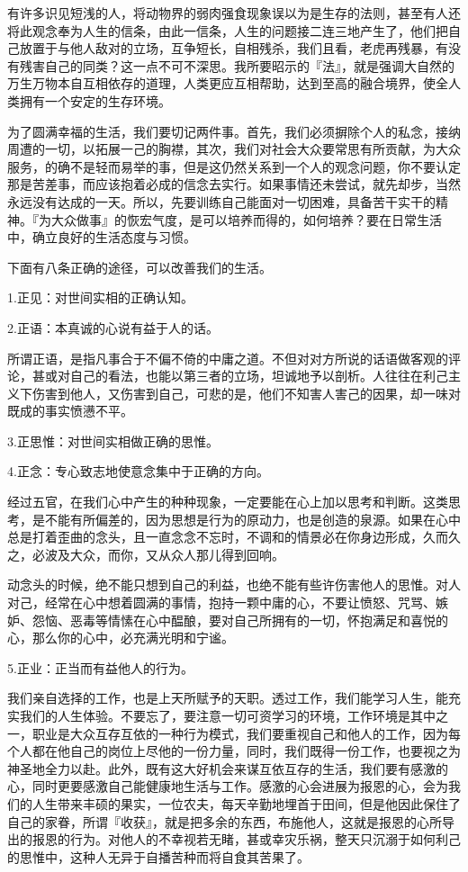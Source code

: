 \documentclass[12pt,twoside,openany]{book}
\begin{document}
有许多识见短浅的人，将动物界的弱肉强食现象误以为是生存的法则，甚至有人还将此观念奉为人生的信条，由此一信条，人生的问题接二连三地产生了，他们把自己放置于与他人敌对的立场，互争短长，自相残杀，我们且看，老虎再残暴，有没有残害自己的同类？这一点不可不深思。我所要昭示的『法』，就是强调大自然的万生万物本自互相依存的道理，人类更应互相帮助，达到至高的融合境界，使全人类拥有一个安定的生存环境。

为了圆满幸福的生活，我们要切记两件事。首先，我们必须摒除个人的私念，接纳周遭的一切，以拓展一己的胸襟，其次，我们对社会大众要常思有所贡献，为大众服务，的确不是轻而易举的事，但是这仍然关系到一个人的观念问题，你不要认定那是苦差事，而应该抱着必成的信念去实行。如果事情还未尝试，就先却步，当然永远没有达成的一天。所以，先要训练自己能面对一切困难，具备苦干实干的精神。『为大众做事』的恢宏气度，是可以培养而得的，如何培养？要在日常生活中，确立良好的生活态度与习惯。

下面有八条正确的途径，可以改善我们的生活。

1.正见：对世间实相的正确认知。

2.正语：本真诚的心说有益于人的话。

所谓正语，是指凡事合于不偏不倚的中庸之道。不但对对方所说的话语做客观的评论，甚或对自己的看法，也能以第三者的立场，坦诚地予以剖析。人往往在利己主义下伤害到他人，又伤害到自己，可悲的是，他们不知害人害己的因果，却一味对既成的事实愤懑不平。

3.正思惟：对世间实相做正确的思惟。

4.正念：专心致志地使意念集中于正确的方向。

经过五官，在我们心中产生的种种现象，一定要能在心上加以思考和判断。这类思考，是不能有所偏差的，因为思想是行为的原动力，也是创造的泉源。如果在心中总是打着歪曲的念头，且一直念念不忘时，不调和的情景必在你身边形成，久而久之，必波及大众，而你，又从众人那儿得到回响。

动念头的时候，绝不能只想到自己的利益，也绝不能有些许伤害他人的思惟。对人对己，经常在心中想着圆满的事情，抱持一颗中庸的心，不要让愤怒、咒骂、嫉妒、怨恼、恶毒等情愫在心中醖酿，要对自己所拥有的一切，怀抱满足和喜悦的心，那么你的心中，必充满光明和宁谧。

5.正业：正当而有益他人的行为。

我们亲自选择的工作，也是上天所赋予的天职。透过工作，我们能学习人生，能充实我们的人生体验。不要忘了，要注意一切可资学习的环境，工作环境是其中之一，职业是大众互存互依的一种行为模式，我们要重视自己和他人的工作，因为每个人都在他自己的岗位上尽他的一份力量，同时，我们既得一份工作，也要视之为神圣地全力以赴。此外，既有这大好机会来谋互依互存的生活，我们要有感激的心，同时更要感激自己能健康地生活与工作。感激的心会进展为报恩的心，会为我们的人生带来丰硕的果实，一位农夫，每天辛勤地埋首于田间，但是他因此保住了自己的家眷，所谓『收获』，就是把多余的东西，布施他人，这就是报恩的心所导出的报恩的行为。对他人的不幸视若无睹，甚或幸灾乐祸，整天只沉溺于如何利己的思惟中，这种人无异于自播苦种而将自食其苦果了。
\end{document}
